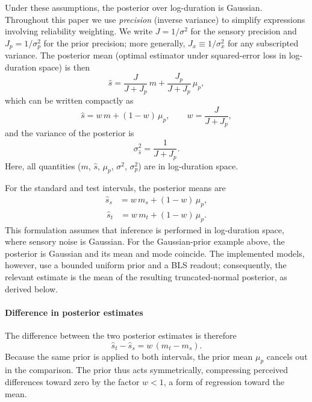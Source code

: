\documentclass{jov}
\begin{document}
Under these assumptions, the posterior over log-duration is Gaussian. Throughout this paper we use \emph{precision} (inverse variance) to simplify expressions involving reliability weighting.  We write $J = 1/\sigma^2$ for the sensory precision and $J_p = 1/\sigma_p^2$ for the prior precision; more generally, $J_x \equiv 1/\sigma_x^2$ for any subscripted variance. The posterior mean (optimal estimator under squared-error loss in log-duration space) is then
\begin{equation}
\hat{s}
=
\frac{J}{J + J_p} \, m
+
\frac{J_p}{J + J_p} \, \mu_p,
\label{eq:posterior_mean}
\end{equation}
which can be written compactly as
\begin{equation}
\hat{s}
=
w\, m + (1-w)\,\mu_p,
\qquad
w = \frac{J}{J + J_p},
\label{eq:posterior_weight}
\end{equation}
and the variance of the posterior is
\begin{equation}
\sigma_{\hat{s}}^2 = \frac{1}{J + J_p}.
\label{eq:posterior_var}
\end{equation}
Here, all quantities ($m$, $\hat{s}$, $\mu_p$, $\sigma^2$, $\sigma_p^2$) are in log-duration space.

For the standard and test intervals, the posterior means are
\begin{align}
\hat{s}_s &= w\, m_s + (1-w)\,\mu_p,
\label{eq:posterior_standard} 
\end{align}
\begin{align}
\hat{s}_t &= w\, m_t + (1-w)\,\mu_p.
\label{eq:posterior_test}
\end{align}
This formulation assumes that inference is performed in log-duration space, where sensory noise is Gaussian. For the Gaussian-prior example above, the posterior is Gaussian and its mean and mode coincide. The implemented models, however, use a bounded uniform prior and a BLS readout; consequently, the relevant estimate is the mean of the resulting truncated-normal posterior, as derived below.

\paragraph{Difference in posterior estimates}

The difference between the two posterior estimates is therefore
\begin{equation}
\hat{s}_t - \hat{s}_s
=
w\,(m_t - m_s).
\label{eq:posterior_difference}
\end{equation}
Because the same prior is applied to both intervals, the prior mean $\mu_p$ cancels out in the comparison. The prior thus acts symmetrically, compressing perceived differences toward zero by the factor $w < 1$, a form of regression toward the mean.
\end{document}
